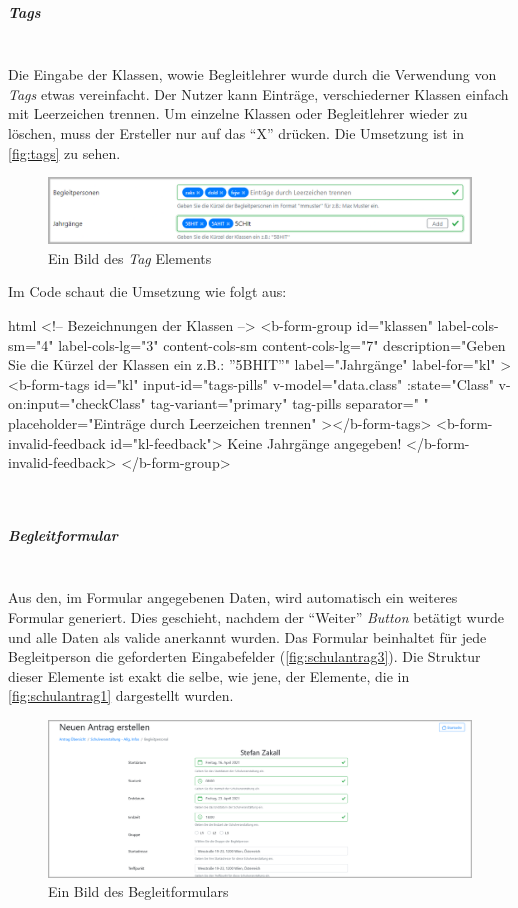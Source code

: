 \subparagraph{Tags}~\\
Die Eingabe der Klassen, wowie Begleitlehrer wurde durch die Verwendung von \textit{Tags} etwas vereinfacht. Der Nutzer kann Einträge, verschiederner Klassen einfach mit Leerzeichen trennen. Um einzelne Klassen oder Begleitlehrer wieder zu löschen, muss der Ersteller nur auf das \enquote{X} drücken. Die Umsetzung ist in \autoref{fig:tags} zu sehen.
\begin{figure}[H]
	\centering
	\includegraphics[width=0.8\linewidth]{images/ldehner_implementierung/tags}
	\caption[Tags]{Ein Bild des \textit{Tag} Elements}
	\label{fig:tags}
\end{figure}
Im Code schaut die Umsetzung wie folgt aus:
\begin{code}{html}
<!-- Bezeichnungen der Klassen -->
<b-form-group
	id="klassen"
	label-cols-sm="4"
	label-cols-lg="3"
	content-cols-sm
	content-cols-lg="7"
	description="Geben Sie die Kürzel der Klassen ein z.B.: ''5BHIT''"
	label="Jahrgänge"
	label-for="kl"
>
	<b-form-tags
		id="kl"
		input-id="tags-pills"
		v-model="data.class"
		:state="Class"
		v-on:input="checkClass"
		tag-variant="primary"
		tag-pills
		separator=" "
		placeholder="Einträge durch Leerzeichen trennen"
	></b-form-tags>
	<b-form-invalid-feedback id="kl-feedback">
		Keine Jahrgänge angegeben!
	</b-form-invalid-feedback>
</b-form-group>
\end{code}
\label{list:tags} ~\\
\subparagraph{Begleitformular}~\\
Aus den, im Formular angegebenen Daten, wird automatisch ein weiteres Formular generiert. Dies geschieht, nachdem der \enquote{Weiter} \textit{Button} betätigt wurde und alle Daten als valide anerkannt wurden. Das Formular beinhaltet für jede Begleitperson die geforderten Eingabefelder (\autoref{fig:schulantrag3}). Die Struktur dieser Elemente ist exakt die selbe, wie jene, der Elemente, die in \autoref{fig:schulantrag1} dargestellt wurden. 
\begin{figure}[H]
	\centering
	\includegraphics[width=1\linewidth]{images/ldehner_implementierung/schul_3_1}
	\caption[Begleitformular]{Ein Bild des Begleitformulars}
	\label{fig:schulantrag3}
\end{figure}
